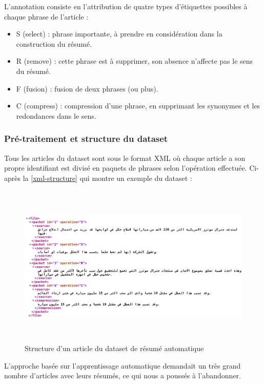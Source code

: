         L'annotation consiste en l'attribution de quatre types d'étiquettes possibles à chaque phrase de l'article :
            \begin{itemize}
                \item S (select) : phrase importante, à prendre en considération dans la construction du résumé.
                \item R (remove) : cette phrase est à supprimer, son absence n'affecte pas le sens du résumé.
                \item F (fusion) : fusion de deux phrases (ou plus).
                \item C (compress) : compression d'une phrase, en supprimant les synonymes et les redondances dans le sens.\\
            \end{itemize}

        \subsubsection{Pré-traitement et structure du dataset}
        Tous les articles du dataset sont sous le format XML où chaque article a son propre identifiant est divisé en paquets de phrases selon l'opération effectuée. Ci-après la \autoref{xml-structure} qui montre un exemple du dataset \cite{riad-belkbir}: 
        \begin{figure}[H]
            \centering
            \includegraphics[height=220pt,width=430pt]{img/chapter4/xml.png}
            \caption{Structure d'un article du dataset de résumé automatique}
            \label{xml-structure}
        \end{figure}
        L'approche basée sur l'apprentissage automatique demandait un très grand nombre d'articles avec leurs résumés, ce qui nous a poussés à l'abandonner.

